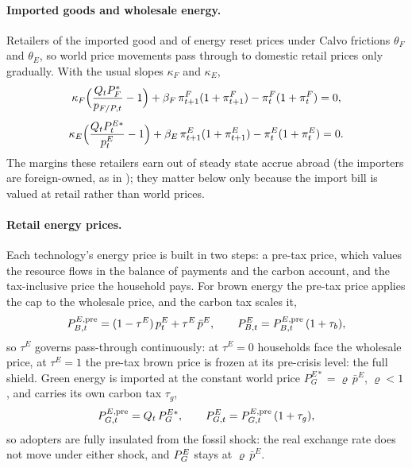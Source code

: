 \paragraph{Imported goods and wholesale energy.}
Retailers of the imported good and of energy reset prices under Calvo frictions
$\theta_F$ and $\theta_E$, so world price movements pass through to domestic
retail prices only gradually. With the usual slopes $\kappa_F$ and $\kappa_E$,
%
\begin{equation}
\kappa_F\Bigl(\frac{Q_t P^{*}_F}{p_{F/P,t}}-1\Bigr)
+ \beta_F\,\pi^F_{t+1}(1+\pi^F_{t+1}) - \pi^F_t(1+\pi^F_t)=0,
\label{eq:pF}
\end{equation}
\begin{equation}
\kappa_E\Bigl(\frac{Q_t P^{E*}_t}{\pE_t}-1\Bigr)
+ \beta_E\,\pi^E_{t+1}(1+\pi^E_{t+1}) - \pi^E_t(1+\pi^E_t)=0.
\label{eq:pE-nkpc}
\end{equation}
%
The margins these retailers earn out of steady state accrue abroad (the importers
are foreign-owned, as in \citealp{auclert2023energy}); they matter below only because the
import bill is valued at retail rather than world prices.

\paragraph{Retail energy prices.}
Each technology's energy price is built in two steps: a pre-tax price, which
values the resource flows in the balance of payments and the carbon account, and
the tax-inclusive price the household pays. For brown energy the pre-tax price
applies the cap to the wholesale price, and the carbon tax scales it,
%
\begin{equation}
\PEBpre[,t]=(1-\tau^E)\,\pE_t+\tau^E\,\bar p^E,
\qquad
\PEB[,t]=\PEBpre[,t]\,(1+\tau_b),
\label{eq:cap}
\end{equation}
%
so $\tau^E$ governs pass-through continuously: at $\tau^E=0$ households face the
wholesale price, at $\tau^E=1$ the pre-tax brown price is frozen at its
pre-crisis level: the full shield. Green energy is imported at the constant
world price $P^{E*}_G=\varrho\,\bar p^E$, $\varrho<1$, and carries its own
carbon tax $\tau_g$,
%
\begin{equation}
\PEGpre[,t]=Q_t\,P^{E*}_G,
\qquad
\PEG[,t]=\PEGpre[,t]\,(1+\tau_g),
\label{eq:pEG2}
\end{equation}
%
so adopters are fully insulated from the fossil shock: the real exchange rate
does not move under either shock, and $\PEG$ stays at $\varrho\,\bar p^E$.

